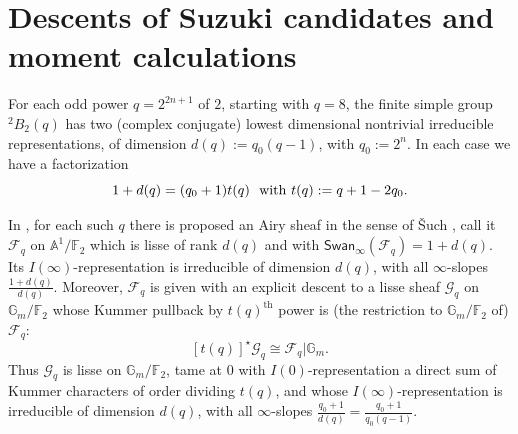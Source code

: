 \documentclass[11pt]{amsart}
\theoremstyle{plain}
\theoremstyle{definition}
\numberwithin{thm}{section}
\numberwithin{equation}{thm}
\newcommand{\Swan}{\mathsf {Swan}}
\newcommand{\sF}{{\mathcal F}}
\newcommand{\sG}{{\mathcal G}}
\newcommand{\A}{{\mathbb A}}
\newcommand{\F}{{\mathbb F}}
\newcommand{\G}{{\mathbb G}}
\newcommand{\0}{\emptyset}
\newcommand{\tw}[1]{{}^#1\!}
\begin{document}
\section{Descents of Suzuki candidates and moment calculations}\label{suz-desc}
For each odd power $q=2^{2n+1}$ of $2$, starting with $q=8$, the finite simple group $\tw2B_2(q)$ has two (complex conjugate) lowest dimensional nontrivial irreducible representations, of dimension $d(q):=q_0(q-1)$, with $q_0:=2^n$. In each case we have a factorization
$$1+d(q) =(q_0+1)t(q)\ \ {\rm with \ }t(q):=q+1-2q_0.$$

In \cite{Ka-ERS}, for each such $q$ there is proposed an Airy sheaf in the sense of  \v{S}uch \cite{Such}, call it $\sF_q$ on $\A^1/\F_2$ which is lisse of rank $d(q)$ and with $\Swan_\infty(\sF_q)=1+d(q)$. Its $I(\infty)$-representation is irreducible of dimension $d(q)$, with all $\infty$-slopes $\frac{1+d(q)}{d(q)}$. Moreover, $\sF_q$ is given \cite[Section 4]{Ka-ERS} with an explicit
descent to a lisse sheaf $\sG_q$ on $\G_m/\F_2$ whose Kummer pullback by $t(q)^{\mathrm {th}}$ power  is (the restriction to $\G_m/\F_2$ of) $\sF_q$:
$$[t(q)]^\star\sG_q \cong \sF_q|\G_m.$$
Thus $\sG_q$ is lisse on $\G_m/\F_2$, tame at $0$ with $I(0)$-representation a direct sum of Kummer characters of order dividing $t(q)$,
and whose $I(\infty)$-representation is irreducible of dimension $d(q)$, with all $\infty$-slopes $\frac{q_0+1}{d(q)}=\frac{q_0+1}{q_0(q-1)}$.
\end{document}
